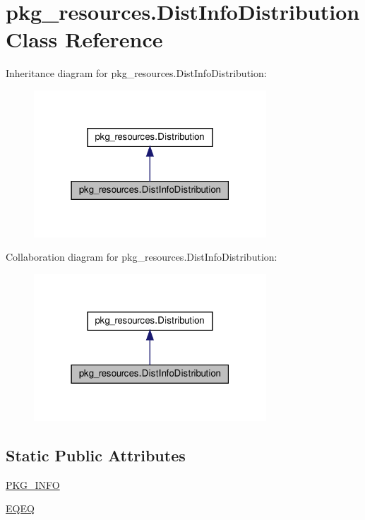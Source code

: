 \hypertarget{classpkg__resources_1_1DistInfoDistribution}{}\section{pkg\+\_\+resources.\+Dist\+Info\+Distribution Class Reference}
\label{classpkg__resources_1_1DistInfoDistribution}


Inheritance diagram for pkg\+\_\+resources.\+Dist\+Info\+Distribution\+:
\nopagebreak
\begin{figure}[H]
\begin{center}
\leavevmode
\includegraphics[width=247pt]{classpkg__resources_1_1DistInfoDistribution__inherit__graph}
\end{center}
\end{figure}


Collaboration diagram for pkg\+\_\+resources.\+Dist\+Info\+Distribution\+:
\nopagebreak
\begin{figure}[H]
\begin{center}
\leavevmode
\includegraphics[width=247pt]{classpkg__resources_1_1DistInfoDistribution__coll__graph}
\end{center}
\end{figure}
\subsection*{Static Public Attributes}
\begin{DoxyCompactItemize}
\item 
\hyperlink{classpkg__resources_1_1DistInfoDistribution_a2b24a6b0e93b2df66840f1a7b0b5015f}{P\+K\+G\+\_\+\+I\+N\+FO}
\item 
\hyperlink{classpkg__resources_1_1DistInfoDistribution_a46319d8886527d84f930481eb4d2d3c2}{E\+Q\+EQ}
\end{DoxyCompactItemize}
